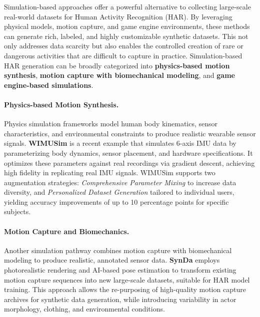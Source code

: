 Simulation-based approaches offer a powerful alternative to collecting large-scale real-world datasets for Human Activity Recognition (HAR). By leveraging physical models, motion capture, and game engine environments, these methods can generate rich, labeled, and highly customizable synthetic datasets. This not only addresses data scarcity but also enables the controlled creation of rare or dangerous activities that are difficult to capture in practice. Simulation-based HAR generation can be broadly categorized into \textbf{physics-based motion synthesis}, \textbf{motion capture with biomechanical modeling}, and \textbf{game engine-based simulations}.

\paragraph{Physics-based Motion Synthesis.}
Physics simulation frameworks model human body kinematics, sensor characteristics, and environmental constraints to produce realistic wearable sensor signals. \textbf{WIMUSim} \cite{oishi2025wimusim} is a recent example that simulates 6-axis IMU data by parameterizing body dynamics, sensor placement, and hardware specifications. It optimizes these parameters against real recordings via gradient descent, achieving high fidelity in replicating real IMU signals. WIMUSim supports two augmentation strategies: \emph{Comprehensive Parameter Mixing} to increase data diversity, and \emph{Personalized Dataset Generation} tailored to individual users, yielding accuracy improvements of up to 10 percentage points for specific subjects.

\paragraph{Motion Capture and Biomechanics.}
Another simulation pathway combines motion capture with biomechanical modeling to produce realistic, annotated sensor data. \textbf{SynDa} \cite{rajendran2022synda} employs photorealistic rendering and AI-based pose estimation to transform existing motion capture sequences into new large-scale datasets, suitable for HAR model training. This approach allows the re-purposing of high-quality motion capture archives for synthetic data generation, while introducing variability in actor morphology, clothing, and environmental conditions.

